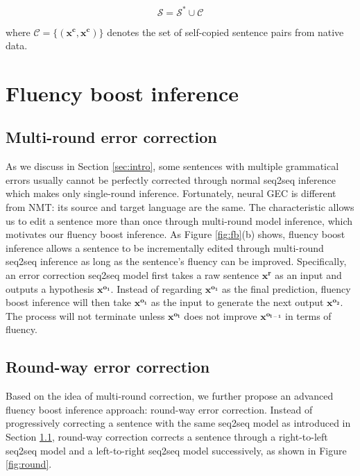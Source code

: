 \documentclass{article} %
\begin{document}
\vspace{-0.5cm}
\begin{displaymath}
\mathcal{S}=\mathcal{S}^* \cup \mathcal{C}
\end{displaymath}\vspace{-0.6cm}

\noindent where $\mathcal{C}=\{(\boldsymbol{x^c},\boldsymbol{x^c})\}$ denotes the set of self-copied sentence pairs from native data.

\section{Fluency boost inference}
\subsection{Multi-round error correction}\label{subsec:multiround}

As we discuss in Section \ref{sec:intro}, some sentences with multiple grammatical errors usually cannot be perfectly corrected through normal seq2seq inference which makes only single-round inference. Fortunately, neural GEC is different from NMT: its source and target language are the same. The characteristic allows us to edit a sentence more than once through multi-round model inference, which motivates our fluency boost inference. As Figure \ref{fig:fb}(b) shows, fluency boost inference allows a sentence to be incrementally edited through multi-round seq2seq inference as long as the sentence's fluency can be improved. Specifically, an error correction seq2seq model first takes a raw sentence $\boldsymbol{x^r}$ as an input and outputs a hypothesis $\boldsymbol{x^{o_1}}$. Instead of regarding $\boldsymbol{x^{o_1}}$ as the final prediction, fluency boost inference will then take $\boldsymbol{x^{o_1}}$ as the input to generate the next output $\boldsymbol{x^{o_2}}$. The process will not terminate unless $\boldsymbol{x^{o_t}}$ does not improve $\boldsymbol{x^{o_{t-1}}}$ in terms of fluency. %

\subsection{Round-way error correction}\label{subsec:round-way}
Based on the idea of multi-round correction, we further propose an advanced fluency boost inference approach: round-way error correction. Instead of progressively correcting a sentence with the same seq2seq model as introduced in Section \ref{subsec:multiround}, round-way correction corrects a sentence through a right-to-left seq2seq model and a left-to-right seq2seq model successively, as shown in Figure \ref{fig:round}.
\end{document}
